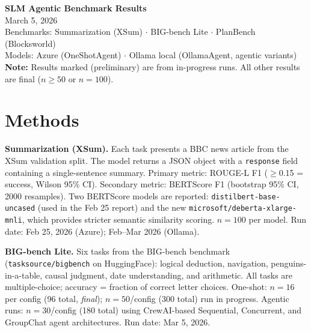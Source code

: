 \documentclass[11pt,letterpaper]{article}
\begin{document}
\begin{center}
{\LARGE \textbf{SLM Agentic Benchmark Results}}\\[4pt]
{\large March 5, 2026}\\[6pt]
{\small\textcolor{notegray}{Benchmarks: Summarization (XSum) $\cdot$ BIG-bench Lite $\cdot$ PlanBench (Blocksworld)}}\\[2pt]
{\small\textcolor{notegray}{Models: Azure (OneShotAgent) $\cdot$ Ollama local (OllamaAgent, agentic variants)}}\\[2pt]
{\small\textcolor{prelim}{\textbf{Note:} Results marked \textnormal{(preliminary)} are from in-progress runs. All other results are final ($n\geq50$ or $n=100$).}}
\end{center}

\vspace{0.3cm}

\section*{Methods}

\textbf{Summarization (XSum).} Each task presents a BBC news article from the XSum validation split. The model returns a JSON object with a \texttt{response} field containing a single-sentence summary. Primary metric: ROUGE-L F1 ($\geq$0.15 = success, Wilson 95\% CI). Secondary metric: BERTScore F1 (bootstrap 95\% CI, 2000 resamples). Two BERTScore models are reported: \texttt{distilbert-base-uncased} (used in the Feb 25 report) and the new \texttt{microsoft/deberta-xlarge-mnli}, which provides stricter semantic similarity scoring. $n=100$ per model. Run date: Feb 25, 2026 (Azure); Feb--Mar 2026 (Ollama).

\textbf{BIG-bench Lite.} Six tasks from the BIG-bench benchmark (\texttt{tasksource/bigbench} on HuggingFace): logical deduction, navigation, penguins-in-a-table, causal judgment, date understanding, and arithmetic. All tasks are multiple-choice; accuracy = fraction of correct letter choices. One-shot: $n=16$ per config (96 total, \textit{final}); $n=50$/config (300 total) run in progress. Agentic runs: $n=30$/config (180 total) using CrewAI-based Sequential, Concurrent, and GroupChat agent architectures. Run date: Mar 5, 2026.
\end{document}
